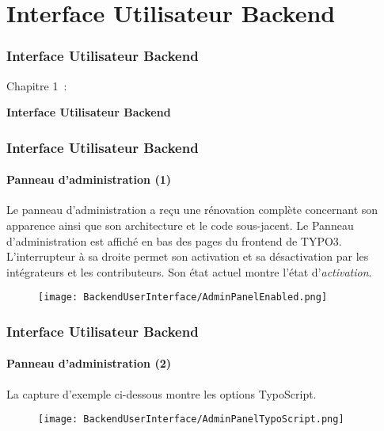 %

\section{Interface Utilisateur Backend}
\begin{frame}[fragile]
	\frametitle{Interface Utilisateur Backend}

	\begin{center}\huge{Chapitre 1~:}\end{center}
	\begin{center}\huge{\color{typo3darkgrey}\textbf{Interface Utilisateur Backend}}\end{center}

\end{frame}


\begin{frame}[fragile]
	\frametitle{Interface Utilisateur Backend}
	\framesubtitle{Panneau d'administration (1)}

    Le panneau d'administration a reçu une rénovation complète concernant son
    apparence ainsi que son architecture et le code sous-jacent.
	\newline\newline
	Le Panneau d'administration est affiché en bas des pages du frontend de TYPO3.
	L'interrupteur à sa droite permet son activation et sa désactivation par les
	intégrateurs et les contributeurs. Son état actuel montre l'état d'\textit{activation}.

	\begin{figure}
		\texttt{[image: BackendUserInterface/AdminPanelEnabled.png]}
	\end{figure}

\end{frame}


\begin{frame}[fragile]
	\frametitle{Interface Utilisateur Backend}
	\framesubtitle{Panneau d'administration (2)}

	La capture d'exemple ci-dessous montre les options TypoScript.

	\begin{figure}
		\texttt{[image: BackendUserInterface/AdminPanelTypoScript.png]}
	\end{figure}

\end{frame}


